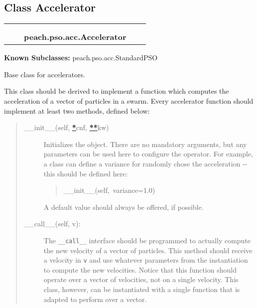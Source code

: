 
\subsection{Class Accelerator}

    \label{peach:pso:acc:Accelerator}
\begin{tabular}{cccccc}
\multicolumn{2}{r}{\settowidth{\BCL}{object}\multirow{2}{\BCL}{object}}
&&
  \\\cline{3-3}
  &&\multicolumn{1}{c|}{}
&&
  \\
&&\multicolumn{2}{l}{\textbf{peach.pso.acc.Accelerator}}
\end{tabular}

\textbf{Known Subclasses:} peach.pso.acc.StandardPSO


Base class for accelerators.

This class should be derived to implement a function which computes the
acceleration of a vector of particles in a swarm. Every accelerator function
should implement at least two methods, defined below:
%
\begin{quote}
%
\begin{description}
\item[{\_\_init\_\_(self, %
\hyperlink{id1}{\textbf{\color{red}*}}cnf, %
\hyperlink{id3}{\textbf{\color{red}**}}kw)}] \leavevmode 
Initializes the object. There are no mandatory arguments, but any
parameters can be used here to configure the operator. For example, a
class can define a variance for randomly chose the acceleration -{}- this
should be defined here:
%
\begin{quote}{\ttfamily \raggedright \noindent
\_\_init\_\_(self,~variance=1.0)
}
\end{quote}

A default value should always be offered, if possible.

\item[{\_\_call\_\_(self, v):}] \leavevmode 
The \texttt{\_\_call\_\_} interface should be programmed to actually compute the
new velocity of a vector of particles. This method should receive a
velocity in \texttt{v} and use whatever parameters from the instantiation to
compute the new velocities. Notice that this function should operate
over a vector of velocities, not on a single velocity. This class,
however, can be instantiated with a single function that is adapted to
perform over a vector.

\end{description}

\end{quote}

